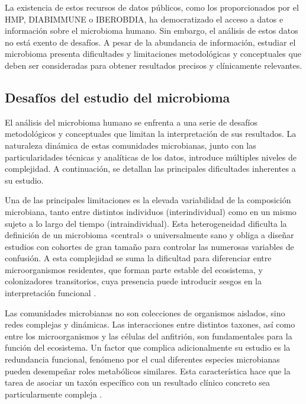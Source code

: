 
La existencia de estos recursos de datos públicos, como los proporcionados por el HMP, DIABIMMUNE o IBEROBDIA, ha democratizado el acceso a datos e información sobre el microbioma humano. Sin embargo, el análisis de estos datos no está exento de desafíos. A pesar de la abundancia de información, estudiar el microbioma presenta dificultades y limitaciones metodológicas y conceptuales que deben ser consideradas para obtener resultados precisos y clínicamente relevantes.

\subsection{Desafíos del estudio del microbioma}

El análisis del microbioma humano se enfrenta a una serie de desafíos metodológicos y conceptuales que limitan la interpretación de sus resultados. La naturaleza dinámica de estas comunidades microbianas, junto con las particularidades técnicas y analíticas de los datos, introduce múltiples niveles de complejidad. A continuación, se detallan las principales dificultades inherentes a su estudio.

Una de las principales limitaciones es la elevada variabilidad de la composición microbiana, tanto entre distintos individuos (interindividual) como en un mismo sujeto a lo largo del tiempo (intraindividual). Esta heterogeneidad dificulta la definición de un microbioma «central» o universalmente sano y obliga a diseñar estudios con cohortes de gran tamaño para controlar las numerosas variables de confusión. A esta complejidad se suma la dificultad para diferenciar entre microorganismos residentes, que forman parte estable del ecosistema, y colonizadores transitorios, cuya presencia puede introducir sesgos en la interpretación funcional \cite{fu2019temporal, lyu2023methodological}.

Las comunidades microbianas no son colecciones de organismos aislados, sino redes complejas y dinámicas. Las interacciones entre distintos taxones, así como entre los microorganismos y las células del anfitrión, son fundamentales para la función del ecosistema. Un factor que complica adicionalmente su estudio es la redundancia funcional, fenómeno por el cual diferentes especies microbianas pueden desempeñar roles metabólicos similares. Esta característica hace que la tarea de asociar un taxón específico con un resultado clínico concreto sea particularmente compleja \cite{zuniga2017elucidation, layeghifard2017disentangling}.

